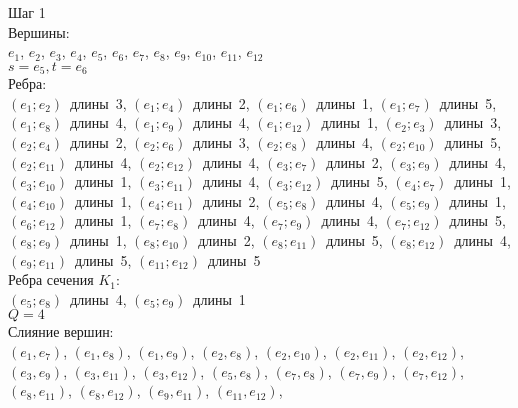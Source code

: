 \documentclass[a4paper,12pt]{article}
\begin{document}
\noindent
\begin{minipage}{\textwidth}
Шаг 1\\
Вершины:\\
\mbox{$e_{1}$},
\mbox{$e_{2}$},
\mbox{$e_{3}$},
\mbox{$e_{4}$},
\mbox{$e_{5}$},
\mbox{$e_{6}$},
\mbox{$e_{7}$},
\mbox{$e_{8}$},
\mbox{$e_{9}$},
\mbox{$e_{10}$},
\mbox{$e_{11}$},
\mbox{$e_{12}$}\\
\mbox{$s=e_{5},t=e_{6}$}\\
Ребра:\\
\mbox{$(e_{1};e_{2})$ длины 3},
\mbox{$(e_{1};e_{4})$ длины 2},
\mbox{$(e_{1};e_{6})$ длины 1},
\mbox{$(e_{1};e_{7})$ длины 5},
\mbox{$(e_{1};e_{8})$ длины 4},
\mbox{$(e_{1};e_{9})$ длины 4},
\mbox{$(e_{1};e_{12})$ длины 1},
\mbox{$(e_{2};e_{3})$ длины 3},
\mbox{$(e_{2};e_{4})$ длины 2},
\mbox{$(e_{2};e_{6})$ длины 3},
\mbox{$(e_{2};e_{8})$ длины 4},
\mbox{$(e_{2};e_{10})$ длины 5},
\mbox{$(e_{2};e_{11})$ длины 4},
\mbox{$(e_{2};e_{12})$ длины 4},
\mbox{$(e_{3};e_{7})$ длины 2},
\mbox{$(e_{3};e_{9})$ длины 4},
\mbox{$(e_{3};e_{10})$ длины 1},
\mbox{$(e_{3};e_{11})$ длины 4},
\mbox{$(e_{3};e_{12})$ длины 5},
\mbox{$(e_{4};e_{7})$ длины 1},
\mbox{$(e_{4};e_{10})$ длины 1},
\mbox{$(e_{4};e_{11})$ длины 2},
\mbox{$(e_{5};e_{8})$ длины 4},
\mbox{$(e_{5};e_{9})$ длины 1},
\mbox{$(e_{6};e_{12})$ длины 1},
\mbox{$(e_{7};e_{8})$ длины 4},
\mbox{$(e_{7};e_{9})$ длины 4},
\mbox{$(e_{7};e_{12})$ длины 5},
\mbox{$(e_{8};e_{9})$ длины 1},
\mbox{$(e_{8};e_{10})$ длины 2},
\mbox{$(e_{8};e_{11})$ длины 5},
\mbox{$(e_{8};e_{12})$ длины 4},
\mbox{$(e_{9};e_{11})$ длины 5},
\mbox{$(e_{11};e_{12})$ длины 5}\\
Ребра сечения $K_{1}$:\\
\mbox{$(e_{5};e_{8})$ длины 4},
\mbox{$(e_{5};e_{9})$ длины 1}\\
$Q=4$\\
Слияние вершин:\\
\mbox{$(e_{1},e_{7})$},
\mbox{$(e_{1},e_{8})$},
\mbox{$(e_{1},e_{9})$},
\mbox{$(e_{2},e_{8})$},
\mbox{$(e_{2},e_{10})$},
\mbox{$(e_{2},e_{11})$},
\mbox{$(e_{2},e_{12})$},
\mbox{$(e_{3},e_{9})$},
\mbox{$(e_{3},e_{11})$},
\mbox{$(e_{3},e_{12})$},
\mbox{$(e_{5},e_{8})$},
\mbox{$(e_{7},e_{8})$},
\mbox{$(e_{7},e_{9})$},
\mbox{$(e_{7},e_{12})$},
\mbox{$(e_{8},e_{11})$},
\mbox{$(e_{8},e_{12})$},
\mbox{$(e_{9},e_{11})$},
\mbox{$(e_{11},e_{12})$},
\end{minipage}
\end{document}
